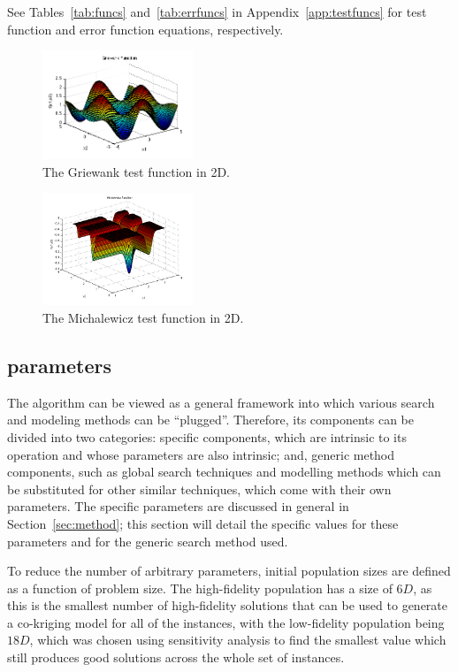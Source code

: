 See Tables~\ref{tab:funcs} and~\ref{tab:errfuncs} in Appendix~\ref{app:testfuncs} for test function and error function equations, respectively.

\begin{figure}[h!]
  \centering
  \includegraphics[width = 0.40\textwidth]{img/griewank.png} 
  \caption{The Griewank test function in 2D.} 
    \label{fig:grie}
\end{figure}
\begin{figure}[h!]
  \centering
  \includegraphics[width = 0.40\textwidth]{img/michal.png} 
  \caption{The Michalewicz test function in 2D.} 
    \label{fig:michal}
\end{figure}

\subsection{\AlgName{} parameters}
The \AlgName{} algorithm can be viewed as a general framework into which various search and modeling methods can be ``plugged''. Therefore, its components can be divided into two categories: \AlgName{} specific components, which are intrinsic to its operation and whose parameters are also intrinsic; and, generic method components, such as global search techniques and modelling methods which can be substituted for other similar techniques, which come with their own parameters. The \AlgName{} specific parameters are discussed in general in Section~\ref{sec:method}; this section will detail the specific values for these  parameters and for the generic search method used.

To reduce the number of arbitrary parameters, initial population sizes are defined as a function of problem size. The high-fidelity population has a size of $6D$, as this is the smallest number of high-fidelity solutions that can be used to generate a co-kriging model for all of the instances, with the low-fidelity population being $18D$, which was chosen using sensitivity analysis to find the smallest value which still produces good solutions across the whole set of instances.

